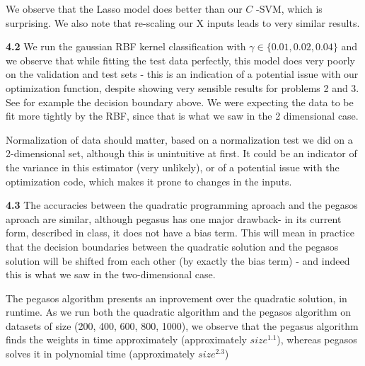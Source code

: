 \documentclass[10pt]{article}
\newcommand{\ds}{\displaystyle}
\begin{document}
We observe that the Lasso model does better than our $\ds C$ -SVM, which is surprising. We also note that re-scaling our X inputs leads to very similar results.

\textbf{4.2} We run the gaussian RBF kernel classification with $\ds \gamma \in \{0.01, 0.02, 0.04\}$ and we observe that while fitting the test data perfectly, this model does very poorly on the validation and test sets - this is an indication of a potential issue with our optimization function, despite showing very sensible results for problems 2 and 3. See for example the decision boundary above. We were expecting the data to be fit more tightly by the RBF, since that is what we saw in the 2 dimensional case.

Normalization of data should matter, based on a normalization test we did on a 2-dimensional set, although this is unintuitive at first. It could be an indicator of the variance in this estimator (very unlikely), or of a potential issue with the optimization code, which makes it prone to changes in the inputs.

\textbf{4.3} The accuracies between the quadratic programming aproach and the pegasos aproach are similar, although pegasus has one major drawback- in its current form, described in class, it does not have a bias term. This will mean in practice that the decision boundaries between the quadratic solution and the pegasos solution will be shifted from each other (by exactly the bias term) - and indeed this is what we saw in the two-dimensional case.

The pegasos algorithm presents an inprovement over the quadratic solution, in runtime. As we run both the quadratic algorithm and the pegasos algorithm on datasets of size (200, 400, 600, 800, 1000), we observe that the pegasus algorithm finds the weights in time approximately (approximately $size^{1.1}$), whereas pegasos solves it in polynomial time (approximately $\ds size^{2.3}$)
\end{document}
